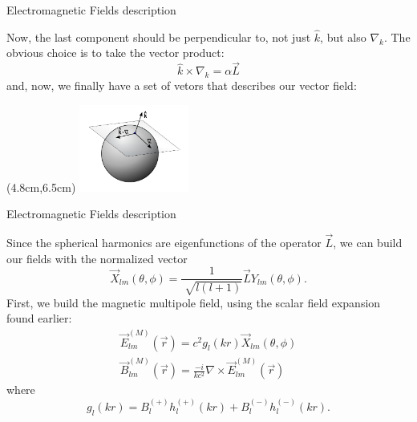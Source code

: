 \documentclass[10pt]{beamer}
\begin{document}

\begin{frame}[fragile]{Electromagnetic Fields description}

Now, the last component should be perpendicular to, not just $\hat{k}$, but also $\nabla_k$. The obvious choice is to take the vector product:
      \begin{equation*}
          \hat{k}\times\nabla_k = \alpha \vec{L}
      \end{equation*}
and, now, we finally have a set of vetors that describes our vector field:
        \begin{textblock*}{3cm}(4.8cm,6.5cm)
            \includegraphics[width=3.6cm]{tangesfkdk}
        \end{textblock*}

\end{frame}


\begin{frame}[fragile]{Electromagnetic Fields description}

Since the spherical harmonics are eigenfunctions of the operator $\vec{L}$, we can build our fields with the normalized vector
      \begin{equation*}
          \vec{X}_{lm}(\theta,\phi)=\frac{1}{\sqrt[]{l(l+1)}}\vec{L}Y_{lm}(\theta,\phi).
      \end{equation*}
First, we build the magnetic multipole field, using the scalar field expansion found earlier:
      \begin{equation*}
      \begin{split}
          \vec{E}_{lm}^{(M)}(\vec{r})=c^2g_l(kr)\vec{X}_{lm}(\theta,\phi)\\
          \vec{B}_{lm}^{(M)}(\vec{r})=\frac{-i}{kc^2}\nabla \times \vec{E}_{lm}^{(M)}(\vec{r})
      \end{split}
      \end{equation*}
where
      \begin{equation*}
          g_l(kr)= B^{(+)}_{l}h^{(+)}_l(kr) + B^{(-)}_{l}h^{(-)}_l(kr).
      \end{equation*}
\end{frame}
\end{document}
